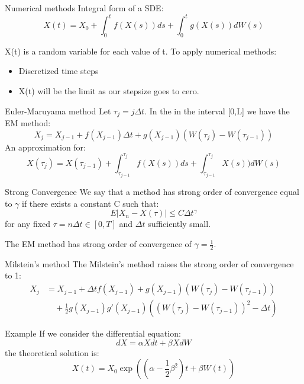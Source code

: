 \begin{frame}{Numerical methods}
Integral form of a SDE: 
$$X(t)=X_0+\int_{0}^{t}f(X(s))ds+\int_{0}^{t}g(X(s))dW(s)$$

X(t) is a random variable for each value of t. To apply numerical methods:
	\begin{itemize}
		\item Discretized time steps	
		\item X(t) will be the limit as our stepsize goes to cero.
	\end{itemize}
\end{frame}

\begin{frame}{Euler-Maruyama method}
Let $\tau_j=j\Delta t$. In the in the interval [0,L] we have the EM method:\bigskip\\
$$X_j=X_{j-1}+f(X_{j-1})\Delta t+g(X_{j-1})(W(\tau_j)-W(\tau_{j-1}))$$
 An approximation for:
$$X(\tau_j)=X(\tau_{j-1})+\int_{\tau_{j-1}}^{\tau_{j}}f(X(s))ds+\int_
{\tau_{j-1}}^{\tau_{j}}X(s))dW(s)$$
\end{frame}

\begin{frame}
\begin{block}{Strong Convergence}
We say that a method has strong order of convergence equal to $\gamma$ if there exists a constant C such that:
$$E|X_n-X(\tau)|\leq C \Delta t^\gamma$$
for any fixed $\tau=n \Delta t \in [0,T]$ and $\Delta t$ sufficiently small.
\end{block}
\bigskip
The EM method has strong order of convergence of $\gamma=\frac{1}{2}$.
\end{frame}

\begin{frame}{Milstein's method}
The Milstein's method raises the strong order of convergence to 1:	
	\begin{equation*}
	\begin{split}
	X_{j} & =X_{j-1}+\Delta t f(X_{j-1})+g(X_{j-1})(W(\tau_j)-W(\tau_{j-1}))\\
	  &\quad +\frac{1}{2}g(X_{j-1})g'(X_{j-1})((W(\tau_j)-W(\tau_{j-1}))^2-\Delta t)
	\end{split}
	\end{equation*}
\end{frame}

\begin{frame}{Example}
If we consider the differential equation:
	\begin{equation*}
	dX=\alpha X dt+ \beta X dW
	\end{equation*}
the theoretical solution is: 
	\begin{equation*}
	X(t)=X_{0}\exp{\left((\alpha -\frac{1}{2}\beta ^2)t +\beta W(t)\right)}
	\end{equation*}
\end{frame}

